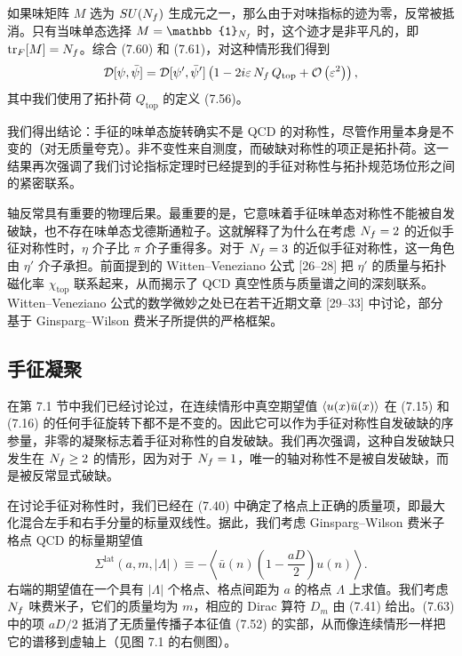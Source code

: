 如果味矩阵 $M$ 选为 $SU(N_f)$ 生成元之一，那么由于对味指标的迹为零，反常被抵消。只有当味单态选择 $M = \mathbb{1}_{\Nf}$ 时，这个迹才是非平凡的，即 $\operatorname{tr}_F[M] = N_f$。综合 (7.60) 和 (7.61)，对这种情形我们得到
\begin{equation}
  \mathcal{D}[\psi,\bar\psi]
  = \mathcal{D}[\psi',\bar\psi']\left(1 - 2i\varepsilon\,N_f\,Q_{\mathrm{top}}
     + \mathcal{O}\left(\varepsilon^2\right)\right),
\end{equation}
其中我们使用了拓扑荷 $Q_{\mathrm{top}}$ 的定义 (7.56)。

我们得出结论：手征的味单态旋转确实不是 QCD 的对称性，尽管作用量本身是不变的（对无质量夸克）。非不变性来自测度，而破缺对称性的项正是拓扑荷。这一结果再次强调了我们讨论指标定理时已经提到的手征对称性与拓扑规范场位形之间的紧密联系。

轴反常具有重要的物理后果。最重要的是，它意味着手征味单态对称性不能被自发破缺，也不存在味单态戈德斯通粒子。这就解释了为什么在考虑 $N_f = 2$ 的近似手征对称性时，$\eta$ 介子比 $\pi$ 介子重得多。对于 $N_f = 3$ 的近似手征对称性，这一角色由 $\eta'$ 介子承担。前面提到的 Witten--Veneziano 公式 [26--28] 把 $\eta'$ 的质量与拓扑磁化率 $\chi_{\mathrm{top}}$ 联系起来，从而揭示了 QCD 真空性质与质量谱之间的深刻联系。Witten--Veneziano 公式的数学微妙之处已在若干近期文章 [29--33] 中讨论，部分基于 Ginsparg--Wilson 费米子所提供的严格框架。

\subsection{手征凝聚}

在第 7.1 节中我们已经讨论过，在连续情形中真空期望值 $\left\langle u(x)\bar{u}(x) \right\rangle$ 在 (7.15) 和 (7.16) 的任何手征旋转下都不是不变的。因此它可以作为手征对称性自发破缺的序参量，非零的凝聚标志着手征对称性的自发破缺。我们再次强调，这种自发破缺只发生在 $N_f \geq 2$ 的情形，因为对于 $N_f = 1$，唯一的轴对称性不是被自发破缺，而是被反常显式破缺。

在讨论手征对称性时，我们已经在 (7.40) 中确定了格点上正确的质量项，即最大化混合左手和右手分量的标量双线性。据此，我们考虑 Ginsparg--Wilson 费米子格点 QCD 的标量期望值
\begin{equation}
  \Sigma^{\mathrm{lat}}(a, m, |\Lambda|) \equiv
  -\left\langle \bar{u}(n)\left(1-\frac{aD}{2}\right)u(n)\right\rangle .
\end{equation}
右端的期望值在一个具有 $|\Lambda|$ 个格点、格点间距为 $a$ 的格点 $\Lambda$ 上求值。我们考虑 $N_f$ 味费米子，它们的质量均为 $m$，相应的 Dirac 算符 $D_m$ 由 (7.41) 给出。(7.63) 中的项 $aD/2$ 抵消了无质量传播子本征值 (7.52) 的实部，从而像连续情形一样把它的谱移到虚轴上（见图 7.1 的右侧图）。

